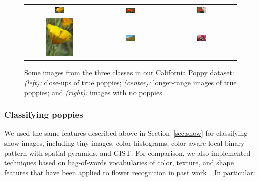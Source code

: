 \begin{figure}[t]
\begin{center}
{\small{
\begin{tabular}{c|c|c}
\includegraphics[width=0.13\textwidth]{figs/closeup1.jpg} &
\includegraphics[width=0.13\textwidth]{figs/field1.jpg}& 
\includegraphics[width=0.13\textwidth]{figs/nopoppy1.jpg}
\\
\includegraphics[height=0.8in]{figs/closeup2.jpg} &
\includegraphics[width=0.13\textwidth]{figs/field2.jpg}& 
\includegraphics[width=0.13\textwidth]{figs/nopoppy2.jpg}
\\
\end{tabular}
}}
\end{center}
\caption{
Some images from the three classes in our California Poppy dataset:
{\textit{(left):}} close-ups of true poppies;  
{\textit{(center):}} longer-range images of true poppies; and  {\textit{(right):}} images with no poppies.
}
\vspace{-12pt}
\label{fig:poppies}
\end{figure}

\subsubsection*{Classifying poppies}
We used the same features described above in Section~\ref{sec:snow}
for classifying snow images, including tiny images, color histograms,
color-aware local binary pattern with spatial pyramids, and GIST.  For
comparison, we also implemented techniques based on bag-of-words
vocabularies of color, texture, and shape features that have been
applied to flower recognition in past work~\cite{flower2006cvpr}. 
In particular:

